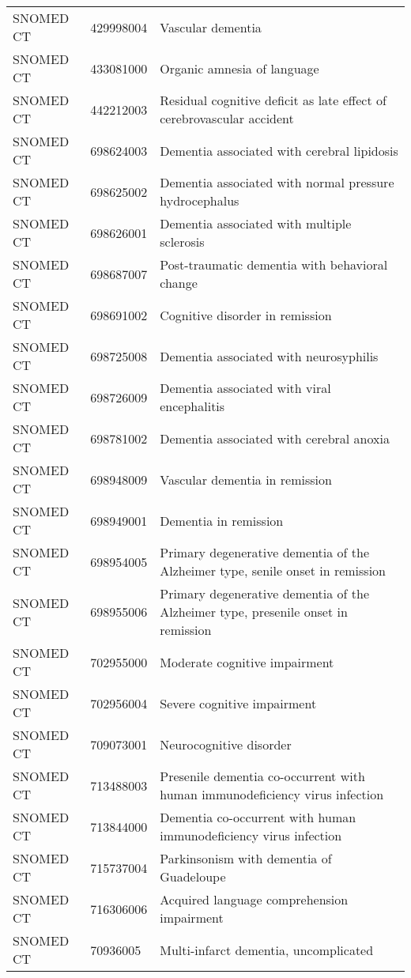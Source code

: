\begin{longtable}{p{}p{}p{}}
  SNOMED CT & 429998004 & Vascular dementia \\ 
  SNOMED CT & 433081000 & Organic amnesia of language \\ 
  SNOMED CT & 442212003 & Residual cognitive deficit as late effect of cerebrovascular accident \\ 
  SNOMED CT & 698624003 & Dementia associated with cerebral lipidosis \\ 
  SNOMED CT & 698625002 & Dementia associated with normal pressure hydrocephalus \\ 
  SNOMED CT & 698626001 & Dementia associated with multiple sclerosis \\ 
  SNOMED CT & 698687007 & Post-traumatic dementia with behavioral change \\ 
  SNOMED CT & 698691002 & Cognitive disorder in remission \\ 
  SNOMED CT & 698725008 & Dementia associated with neurosyphilis \\ 
  SNOMED CT & 698726009 & Dementia associated with viral encephalitis \\ 
  SNOMED CT & 698781002 & Dementia associated with cerebral anoxia \\ 
  SNOMED CT & 698948009 & Vascular dementia in remission \\ 
  SNOMED CT & 698949001 & Dementia in remission \\ 
  SNOMED CT & 698954005 & Primary degenerative dementia of the Alzheimer type, senile onset in remission \\ 
  SNOMED CT & 698955006 & Primary degenerative dementia of the Alzheimer type, presenile onset in remission \\ 
  SNOMED CT & 702955000 & Moderate cognitive impairment \\ 
  SNOMED CT & 702956004 & Severe cognitive impairment \\ 
  SNOMED CT & 709073001 & Neurocognitive disorder \\ 
  SNOMED CT & 713488003 & Presenile dementia co-occurrent with human immunodeficiency virus infection \\ 
  SNOMED CT & 713844000 & Dementia co-occurrent with human immunodeficiency virus infection \\ 
  SNOMED CT & 715737004 & Parkinsonism with dementia of Guadeloupe \\ 
  SNOMED CT & 716306006 & Acquired language comprehension impairment \\ 
  SNOMED CT & 70936005 & Multi-infarct dementia, uncomplicated \\ 

\end{longtable}
